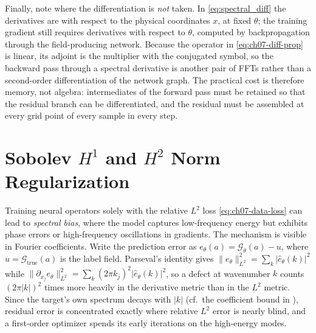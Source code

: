 Finally, note where the differentiation is \emph{not} taken. In
\eqref{eq:spectral_diff} the derivatives are with respect to the physical coordinates $x$, at
fixed $\theta$; the training gradient still requires derivatives with respect to $\theta$,
computed by backpropagation through the field-producing network. Because the operator in
\eqref{eq:ch07-diff-prop} is linear, its adjoint is the multiplier with the conjugated
symbol, so the backward pass through a spectral derivative is another pair of FFTs rather
than a second-order differentiation of the network graph. The practical cost is therefore
memory, not algebra: intermediates of the forward pass must be retained so that the residual
branch can be differentiated, and the residual must be assembled at every grid point of every
sample in every step.

\section{Sobolev \texorpdfstring{$H^1$ and $H^2$}{H1 and H2} Norm Regularization}

Training neural operators solely with the relative $L^2$ loss \eqref{eq:ch07-data-loss} can
lead to \emph{spectral bias}, where the model captures low-frequency
energy but exhibits phase errors or high-frequency oscillations in gradients. The mechanism
is visible in Fourier coefficients. Write the prediction error as
$e_\theta(a)=\mathcal{G}_\theta(a)-u$, where $u=\mathcal{G}_{\text{true}}(a)$ is the label
field. Parseval's identity gives
$\|e_\theta\|_{L^2}^{2}=\sum_k|\hat e_\theta(k)|^{2}$ while
$\|\partial_{x_j}e_\theta\|_{L^2}^{2}=\sum_k(2\pi k_j)^2|\hat e_\theta(k)|^{2}$, so a defect
at wavenumber $k$ counts $(2\pi|k|)^2$ times more heavily in the derivative metric than in
the $L^2$ metric. Since the target's own spectrum decays with $|k|$
(cf.\ the coefficient bound in ),
residual error is concentrated exactly where relative $L^2$ error is nearly blind, and a
first-order optimizer spends its early iterations on the high-energy modes.

